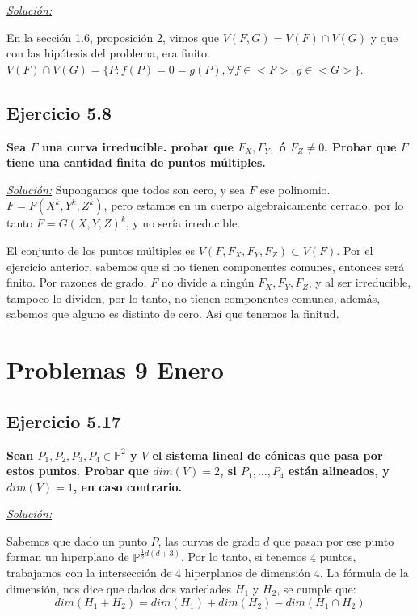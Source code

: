\underline{\textit{Solución:}}

En la sección 1.6, proposición 2, vimos que $V(F,G)=V(F)\cap V(G)$ y que con las hipótesis del problema, era finito. $V(F)\cap V(G)=\{P: f(P)=0=g(P), \forall f\in <F>, g\in <G>\}$.

\subsection{Ejercicio 5.8}

\textbf{Sea $F$ una curva irreducible. probar que $F_X,F_Y,$ ó $F_Z\neq 0$. Probar que $F$ tiene una cantidad finita de puntos múltiples.}

\underline{\textit{Solución:}}
Supongamos que todos son cero, y sea $F$ ese polinomio. $F=F(X^k,Y^k,Z^k)$, pero estamos en un cuerpo algebraicamente cerrado, por lo tanto $F=G(X,Y,Z)^k$, y no sería irreducible. 


El conjunto de los puntos múltiples es $V(F,F_X,F_Y,F_Z)\subset V(F)$. Por el ejercicio anterior, sabemos que si no tienen componentes comunes, entonces será finito. Por razones de grado, $F$ no divide a ningún $F_X,F_Y,F_Z$, y al ser irreducible, tampoco lo dividen, por lo tanto, no tienen componentes comunes, además, sabemos que alguno es distinto de cero. Así que tenemos la finitud.

\newpage

\section{Problemas 9 Enero}

\subsection{Ejercicio 5.17}

\textbf{Sean $P_1,P_2,P_3,P_4\in \mathbb{P}^2$ y $V$ el sistema lineal de cónicas que pasa por estos puntos. Probar que $dim(V)=2$, si $P_1,\dots , P_4$ están alineados, y $dim(V)=1$, en caso contrario.}


\underline{\textit{Solución:}}


Sabemos que dado un punto $P$, las curvas de grado $d$ que pasan por ese punto forman un hiperplano de $\mathbb{P}^{\frac{1}{2}d(d+3)}$. Por lo tanto, si tenemos $4$ puntos, trabajamos con la intersección de $4$ hiperplanos de dimensión $4$. La fórmula de la dimensión, nos dice que dados dos variedades $H_1$ y $H_2$, se cumple que:
$$dim(H_1+H_2)=dim(H_1)+dim(H_2)-dim(H_1\cap H_2)$$

